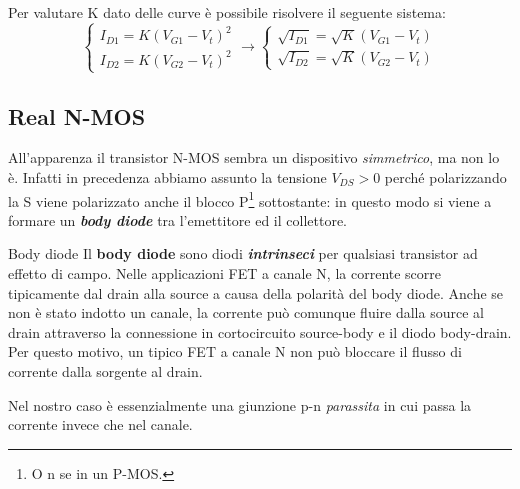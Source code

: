\documentclass[
]{book}
\begin{document}
Per valutare K dato delle curve è possibile risolvere il seguente
sistema: \[
\begin{cases}
I_{D1}=K(V_{G1}-V_{t})^{2}\\
I_{D2}=K(V_{G2}-V_{t})^{2}\end{cases}\longrightarrow\begin{cases}\sqrt{I_{D1}}=\sqrt{K}(V_{G1}-V_{t})\\
\sqrt{I_{D2}}=\sqrt{K}(V_{G2}-V_{t})
\end{cases}
\]

\subsection{Real N-MOS}\label{real-n-mos}

All'apparenza il transistor N-MOS sembra un dispositivo
\emph{simmetrico}, ma non lo è. Infatti in precedenza abbiamo assunto la
tensione \(V_{DS}>0\) perché polarizzando la S viene polarizzato anche
il blocco P\footnote{O n se in un P-MOS.} sottostante: in questo modo si
viene a formare un \textbf{\emph{body diode}} tra l'emettitore ed il
collettore.

\begin{redbox}{Body diode}
Il \textbf{body diode} sono diodi \textbf{\emph{intrinseci}} per qualsiasi transistor ad effetto di campo. Nelle applicazioni FET a canale N, la corrente scorre tipicamente dal drain alla source a causa della polarità del body diode. Anche se non è stato indotto un canale, la corrente può comunque fluire dalla source al drain attraverso la connessione in cortocircuito source-body e il diodo body-drain. Per questo motivo, un tipico FET a canale N non può bloccare il flusso di corrente dalla sorgente al drain.
\end{redbox}

Nel nostro caso è essenzialmente una giunzione p-n \emph{parassita} in
cui passa la corrente invece che nel canale.
\end{document}
